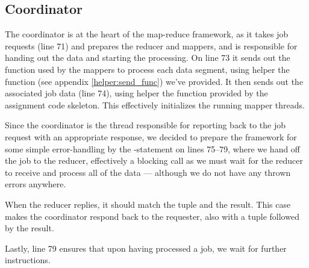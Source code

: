 \subsection{Coordinator}
The coordinator is at the heart of the map-reduce framework, as it takes job
requests (line 71) and prepares the reducer and mappers, and is responsible
for handing out the data and starting the processing. On line 73 it sends out
the function used by the mappers to process each data segment, using helper
the function  (see appendix \ref{helper:send_func}) we've
provided. It then sends out the associated job data (line 74), using helper
the function  provided by the assignment code skeleton. This
effectively initializes the running mapper threads.

Since the coordinator is the thread responsible for reporting back to the job
request with an appropriate response, we decided to prepare the framework for
some simple error-handling by the -statement on lines 75--79, where
we hand off the job to the reducer, effectively a blocking call as we must
wait for the reducer to receive and process all of the data --- although we do
not have any thrown errors anywhere.


When the reducer replies, it should match the tuple  and the result.
This case makes the coordinator respond back to the requester, also with a
tuple  followed by the result.

Lastly, line 79 ensures that upon having processed a job, we wait for further
instructions.
